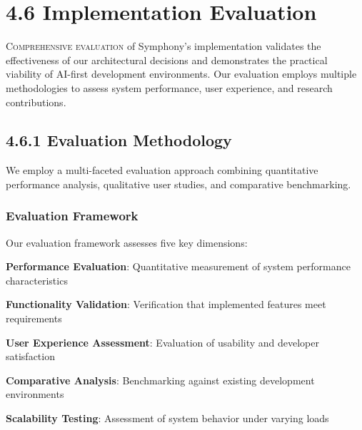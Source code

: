 

\section{4.6 Implementation Evaluation}
\label{sec:database-impl}

\lettrine{C}{omprehensive evaluation} of Symphony's implementation validates the effectiveness of our architectural decisions and demonstrates the practical viability of AI-first development environments. Our evaluation employs multiple methodologies to assess system performance, user experience, and research contributions.

\subsection*{4.6.1 Evaluation Methodology}
\label{subsec:evaluation-methodology}

We employ a multi-faceted evaluation approach combining quantitative performance analysis, qualitative user studies, and comparative benchmarking.

\subsubsection*{Evaluation Framework}

Our evaluation framework assesses five key dimensions:

\begin{compactlist}
    \item \textbf{Performance Evaluation}: Quantitative measurement of system performance characteristics
    \item \textbf{Functionality Validation}: Verification that implemented features meet requirements
    \item \textbf{User Experience Assessment}: Evaluation of usability and developer satisfaction
    \item \textbf{Comparative Analysis}: Benchmarking against existing development environments
    \item \textbf{Scalability Testing}: Assessment of system behavior under varying loads
\end{compactlist}

